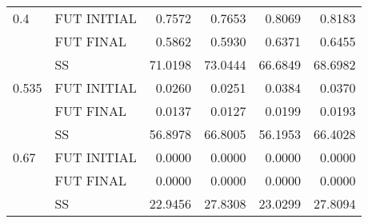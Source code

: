 \begin{table}[ht]
\centering
\begin{tabular}{llrrrr}
  \hline
  \hline
0.4 & FUT INITIAL & 0.7572 & 0.7653 & 0.8069 & 0.8183 \\ 
   & FUT FINAL & 0.5862 & 0.5930 & 0.6371 & 0.6455 \\ 
   & SS & 71.0198 & 73.0444 & 66.6849 & 68.6982 \\ 
  0.535 & FUT INITIAL & 0.0260 & 0.0251 & 0.0384 & 0.0370 \\ 
   & FUT FINAL & 0.0137 & 0.0127 & 0.0199 & 0.0193 \\ 
   & SS & 56.8978 & 66.8005 & 56.1953 & 66.4028 \\ 
  0.67 & FUT INITIAL & 0.0000 & 0.0000 & 0.0000 & 0.0000 \\ 
   & FUT FINAL & 0.0000 & 0.0000 & 0.0000 & 0.0000 \\ 
   & SS & 22.9456 & 27.8308 & 23.0299 & 27.8094 \\ 
   \hline
\end{tabular}
\end{table}
